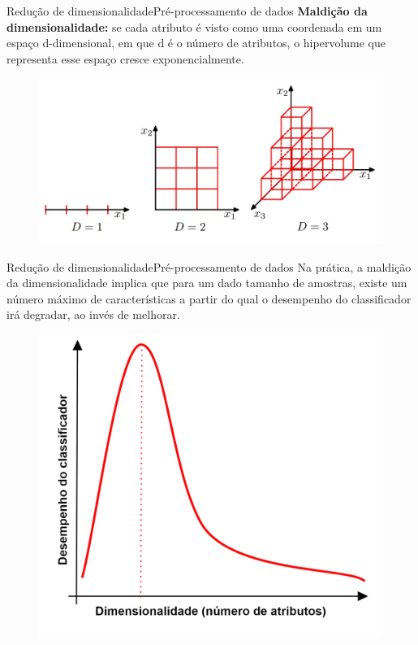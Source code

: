 \documentclass[t]{beamer}
\begin{document}
\begin{ftst}{Redução de dimensionalidade}{Pré-processamento de dados}
\justifying
\textbf{Maldição da dimensionalidade:} se cada atributo é visto como uma coordenada em um espaço d-dimensional, em que d é o número de atributos, o hipervolume que representa esse espaço cresce exponencialmente.
\begin{figure}
    \centering
    \includegraphics[scale=0.4]{Figuras/slide02_04.jpg}
\end{figure}


\end{ftst}


\begin{ftst}{Redução de dimensionalidade}{Pré-processamento de dados}
\justifying
Na prática, a maldição da dimensionalidade implica que para um dado tamanho de amostras, existe um número máximo de características a partir do qual o desempenho do classificador irá degradar, ao invés de melhorar.
\begin{figure}
    \centering
    \includegraphics[scale=0.15]{Figuras/slide02_05.png}
\end{figure}


\end{ftst}
\end{document}
